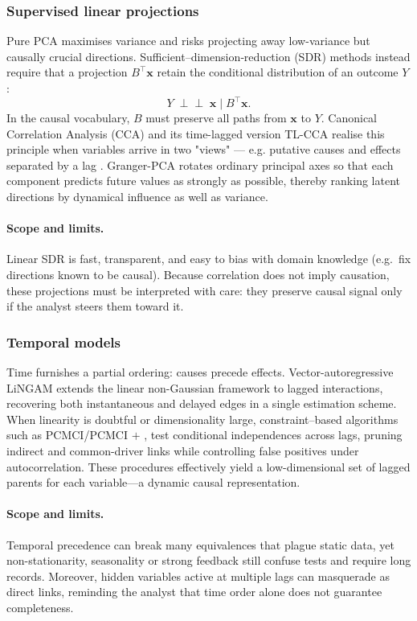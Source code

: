 \documentclass[14pt]{extarticle}
\begin{document}
	\subsubsection*{Supervised linear projections}
	
	Pure PCA \citep{abdi2010principal} maximises variance and risks projecting away low-variance but causally crucial directions.  
	Sufficient–dimension‐reduction (SDR) methods instead require that a projection $B^{\top}\mathbf{x}$ retain the conditional distribution of an outcome $Y$:
	\[
	Y\;\perp\!\!\!\perp\;\mathbf{x}\;\bigl|\;B^{\top}\mathbf{x}.
	\]
	In the causal vocabulary, $B$ must preserve all paths from $\mathbf{x}$ to $Y$.  
	Canonical Correlation Analysis (CCA) and its time-lagged version TL-CCA realise this principle when variables arrive in two "views" — e.g. putative causes and effects separated by a lag \citep{Moneta2023}.  
	Granger-PCA rotates ordinary principal axes so that each component predicts future values as strongly as possible, thereby ranking latent directions by dynamical influence as well as variance.
	
	\paragraph{Scope and limits.}
	Linear SDR is fast, transparent, and easy to bias with domain knowledge (e.g.\ fix directions known to be causal).  
	Because correlation does not imply causation, these projections must be interpreted with care: they preserve causal signal only if the analyst steers them toward it.
	
	\subsubsection*{Temporal models}
	
	Time furnishes a partial ordering: causes precede effects.  
	Vector-autoregressive LiNGAM extends the linear non-Gaussian framework to lagged interactions, recovering both instantaneous and delayed edges in a single estimation scheme.  
	When linearity is doubtful or dimensionality large, constraint–based algorithms such as PCMCI/PCMCI $+$ \citep{Runge2019}, \citep{runge2020discovering} test conditional independences across lags, pruning indirect and common-driver links while controlling false positives under autocorrelation.  
	These procedures effectively yield a low-dimensional set of lagged parents for each variable—a dynamic causal representation.
	
	\paragraph{Scope and limits.}
	Temporal precedence can break many equivalences that plague static data, yet non-stationarity, seasonality or strong feedback still confuse tests and require long records.  
	Moreover, hidden variables active at multiple lags can masquerade as direct links, reminding the analyst that time order alone does not guarantee completeness.
	
\end{document}
